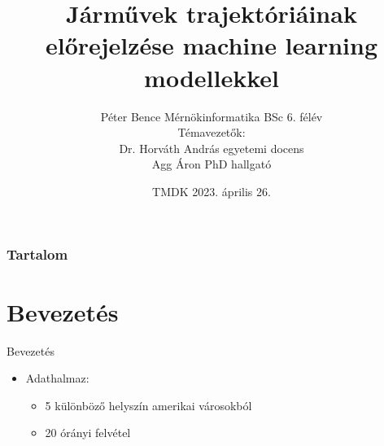 \documentclass{beamer}
\title[Jármű trajektóriák előrejelzése]{Járművek trajektóriáinak előrejelzése machine learning modellekkel}
\author{Péter Bence Mérnökinformatika BSc 6. félév\\
        \vspace{5mm}
        Témavezetők:\\
        Dr. Horváth András egyetemi docens\\
        Agg Áron PhD hallgató}
\institute{Széchenyi István Egyetem}
\date{TMDK 2023. április 26.}
\begin{document}
\begin{frame}
\titlepage
\end{frame}

\begin{frame}
\frametitle{Tartalom}
\tableofcontents
\end{frame}

\section{Bevezetés}
\begin{frame}{Bevezetés}
    \begin{itemize}
        \item Adathalmaz: 
        \begin{itemize}
            \item 5 különböző helyszín amerikai városokból
            \item 20 órányi felvétel
        \end{itemize}
    \end{itemize}
    \centering
\end{frame}
\end{document}
